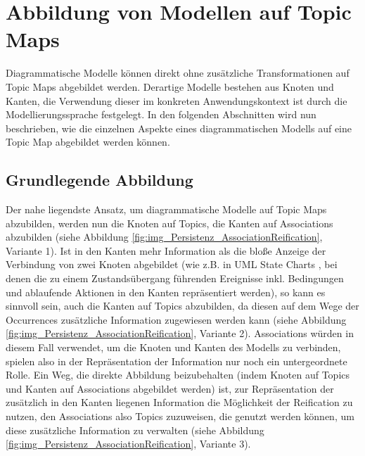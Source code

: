
\section{Abbildung von Modellen auf Topic Maps} %
\label{sec:abbildung_von_modellen_auf_topic_maps}

Diagrammatische Modelle \citep{Oppl05a} können direkt ohne zusätzliche Transformationen auf Topic Maps abgebildet werden. Derartige Modelle bestehen aus Knoten und Kanten, die Verwendung dieser im konkreten Anwendungskontext ist durch die Modellierungssprache festgelegt. In den folgenden Abschnitten wird nun beschrieben, wie die einzelnen Aspekte eines diagrammatischen Modells auf eine Topic Map abgebildet werden können.

\subsection{Grundlegende Abbildung} %
\label{sub:grundlegende_abbildung}
Der nahe liegendste Ansatz, um diagrammatische Modelle auf Topic Maps abzubilden, werden nun die Knoten auf Topics, die Kanten auf Associations abzubilden (siehe Abbildung \ref{fig:img_Persistenz_AssociationReification}, Variante 1). Ist in den Kanten mehr Information als die bloße Anzeige der Verbindung von zwei Knoten abgebildet (wie z.B. in \gls{UML} State Charts \citep{Rumbaugh04}, bei denen die zu einem Zustandsübergang führenden Ereignisse inkl. Bedingungen und ablaufende Aktionen in den Kanten repräsentiert werden), so kann es sinnvoll sein, auch die Kanten auf Topics abzubilden, da diesen auf dem Wege der Occurrences zusätzliche Information zugewiesen werden kann (siehe Abbildung \ref{fig:img_Persistenz_AssociationReification}, Variante 2). Associations würden in diesem Fall verwendet, um die Knoten und Kanten des Modells zu verbinden, spielen also in der Repräsentation der Information nur noch ein untergeordnete Rolle. Ein Weg, die direkte Abbildung beizubehalten (indem Knoten auf Topics und Kanten auf Associations abgebildet werden) ist, zur Repräsentation der zusätzlich in den Kanten liegenen Information die Möglichkeit der Reification zu nutzen, den Associations also Topics zuzuweisen, die genutzt werden können, um diese zusätzliche Information zu verwalten (siehe Abbildung \ref{fig:img_Persistenz_AssociationReification}, Variante 3).

